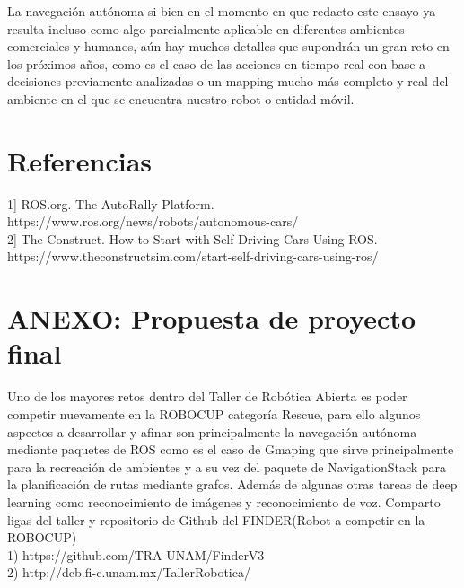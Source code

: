 \documentclass[11pt]{article}
\begin{document}
La navegación autónoma si bien en el momento en que redacto este ensayo ya resulta incluso como algo parcialmente aplicable en diferentes ambientes comerciales y humanos, aún hay muchos detalles que supondrán un gran reto en los próximos años, como es el caso de las acciones en tiempo real con base a decisiones previamente analizadas o un mapping mucho más completo y real del ambiente en el que se encuentra nuestro robot o entidad móvil. 


\section{Referencias}

1] ROS.org. The AutoRally Platform. https://www.ros.org/news/robots/autonomous-cars/\\

2] The Construct. How to Start with Self-Driving Cars Using ROS. https://www.theconstructsim.com/start-self-driving-cars-using-ros/\\


\section{ANEXO: Propuesta de proyecto final}

Uno de los mayores retos dentro del Taller de Robótica Abierta es poder competir nuevamente en la ROBOCUP  categoría Rescue, para ello algunos aspectos a desarrollar y afinar son principalmente la navegación autónoma mediante paquetes de ROS como es el caso de Gmaping que sirve principalmente para la recreación de ambientes y a su vez del paquete de NavigationStack para la planificación de rutas mediante grafos. Además de algunas otras tareas de deep learning como reconocimiento de imágenes y reconocimiento de voz.
Comparto ligas del taller y repositorio de Github del FINDER(Robot a competir en la ROBOCUP)
\\
1) https://github.com/TRA-UNAM/FinderV3\\
2) http://dcb.fi-c.unam.mx/TallerRobotica/
\end{document}
